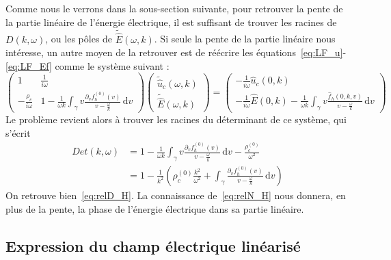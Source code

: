 \begin{remark}
  Comme nous le verrons dans la sous-section suivante, pour retrouver la pente de la partie linéaire de l'énergie électrique, il est suffisant de trouver les racines de $D(k,\omega)$, ou les pôles de $\tilde{\hat{E}}(\omega,k)$. Si seule la pente de la partie linéaire nous intéresse, un autre moyen de la retrouver est de réécrire les équations~\eqref{eq:LF_u}-\eqref{eq:LF_Ef} comme le système suivant :
  \begin{equation}
    \begin{pmatrix}
      1                       & \frac{1}{i\omega} \\
      -\frac{\rho_c}{i\omega} & 1-\frac{1}{\omega k}\int_\gamma v\frac{\partial_v f_h^{(0)}(v)}{v-\frac{\omega}{k}}\,\mathrm{d}v
    \end{pmatrix}
    \begin{pmatrix}
      \tilde{\hat{u}}_c(\omega,k) \\
      \tilde{\hat{E}}(\omega,k)
    \end{pmatrix}
    =
    \begin{pmatrix}
      -\frac{1}{i\omega}\hat{u}_c(0,k) \\
      -\frac{1}{i\omega}\hat{E}(0,k) - \frac{1}{\omega k}\int_\gamma v\frac{\hat{f}_h(0,k,v)}{v-\frac{\omega}{k}}\,\mathrm{d}v
    \end{pmatrix}
    \label{eq:systHyb}
  \end{equation}
  Le problème revient alors à trouver les racines du déterminant de ce système, qui s'écrit
  $$
    \begin{aligned}
      Det(k,\omega) & = 1 - \frac{1}{\omega k}\int_\gamma v\frac{\partial_v f_h^{(0)}(v)}{v-\frac{\omega}{k}}\,\mathrm{d}v - \frac{\rho_c^{(0)}}{\omega^2} \\
                    & = 1 - \frac{1}{k^2}\left( \rho_c^{(0)}\frac{k^2}{\omega^2} + \int_\gamma \frac{\partial_v f_h^{(0)}(v)}{v-\frac{\omega}{k}}\,\mathrm{d}v \right)
    \end{aligned}
  $$
  On retrouve bien~\eqref{eq:relD_H}. La connaissance de~\eqref{eq:relN_H} nous donnera, en plus de la pente, la phase de l'énergie électrique dans sa partie linéaire.
\end{remark}

\subsection{Expression du champ électrique linéarisé}

